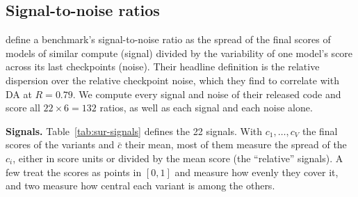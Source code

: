 \subsection{Signal-to-noise ratios}
\label{app:sur-snr}
\label{app:sur-signals}
\label{app:sur-noise}

\citet{heineman_signal_2025} define a benchmark's signal-to-noise ratio as the spread of the final scores of models of similar compute (signal) divided by the variability of one model's score across its last checkpoints (noise). Their headline definition is the relative dispersion over the relative checkpoint noise, which they find to correlate with DA at $R = 0.79$. We compute every signal and noise of their released code and score all $22 \times 6 = 132$ ratios, as well as each signal and each noise alone.

\textbf{Signals.} Table~\ref{tab:sur-signals} defines the 22 signals. With $c_1, \dots, c_V$ the final scores of the variants and $\bar{c}$ their mean, most of them measure the spread of the $c_i$, either in score units or divided by the mean score (the ``relative'' signals). A few treat the scores as points in $[0, 1]$ and measure how evenly they cover it, and two measure how central each variant is among the others.


